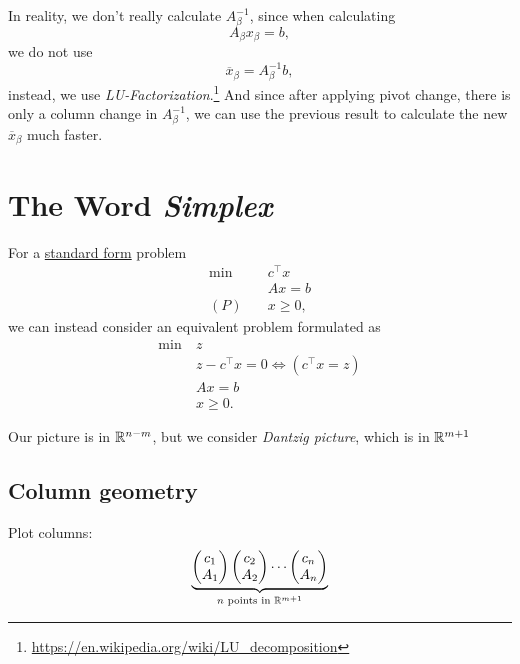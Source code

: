 \begin{note}
	In reality, we don't really calculate \(A^{-1}_{\beta}\), since when calculating
	\[
		A_{\beta}x_{\beta} = b,
	\]
	we do not use
	\[
		\overline{x}_{\beta} = A^{-1}_{\beta}b,
	\]
	instead, we use \emph{LU-Factorization}.\footnote{\url{https://en.wikipedia.org/wiki/LU_decomposition}} And since after applying pivot change,
	there is only a column change in \(A^{-1}_{\beta}\), we can use the previous result
	to calculate the new \(\overline{x}_{\beta}\) much faster.
\end{note}

\section{The Word \emph{Simplex}}
For a \hyperref[def:standard-form]{standard form} problem
\[
	\begin{aligned}
		\min~    & c^{\top}x \\
		         & Ax = b    \\
		(P)\quad & x\geq 0,
	\end{aligned}
\]
we can instead consider an equivalent problem formulated as
\[
	\begin{aligned}
		\min~ & z                                        \\
		      & z - c^{\top} x = 0 \iff (c^{\top} x = z) \\
		      & Ax = b                                   \\
		      & x\geq 0.
	\end{aligned}
\]

\begin{prev}
	Our picture is in \(\mathbb{\MakeUppercase{R}}^{n-m}\), but we consider \emph{Dantzig picture}, which is in \(\mathbb{\MakeUppercase{R}}^{m+1}\)
\end{prev}

\subsection{Column geometry}
Plot columns:
\[
	\underbrace{
		\begin{pmatrix}
			c_1 \\
			A_1 \\
		\end{pmatrix}
		\begin{pmatrix}
			c_2 \\
			A_2 \\
		\end{pmatrix}
		\cdots
		\begin{pmatrix}
			c_n \\
			A_n \\
		\end{pmatrix}}_{n \text{ points in }\mathbb{\MakeUppercase{R}}^{m+1}}
\]

